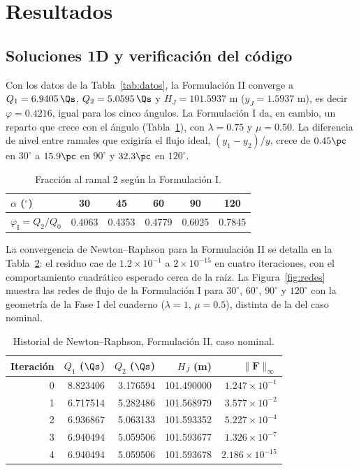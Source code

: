 \section{Resultados}\label{sec:resultados}
\subsection{Soluciones 1D y verificación del código}
Con los datos de la Tabla~\ref{tab:datos}, la Formulación II converge a $Q_1=6.9405\,\Qs$, $Q_2=5.0595\,\Qs$ y $H_J=101.5937$ m ($y_J=1.5937$ m), es decir $\varphi=0.4216$, igual para los cinco ángulos. La Formulación I da, en cambio, un reparto que crece con el ángulo (Tabla~\ref{tab:f1}), con $\lambda=0.75$ y $\mu=0.50$. La diferencia de nivel entre ramales que exigiría el flujo ideal, $(y_1-y_2)/y$, crece de $0.45\pc$ en $30^\circ$ a $15.9\pc$ en $90^\circ$ y $32.3\pc$ en $120^\circ$.

\begin{table}[H]
\centering\small
\caption{Fracción al ramal 2 según la Formulación I.}\label{tab:f1}
\begin{tabular}{lccccc}
\toprule
$\alpha$ ($^\circ$) & 30 & 45 & 60 & 90 & 120\\\midrule
$\varphi_{\mathrm I}=Q_2/Q_0$ & 0.4063 & 0.4353 & 0.4779 & 0.6025 & 0.7845\\\bottomrule
\end{tabular}
\end{table}

La convergencia de Newton--Raphson para la Formulación II se detalla en la Tabla~\ref{tab:iter}: el residuo cae de $1.2\times10^{-1}$ a $2\times10^{-15}$ en cuatro iteraciones, con el comportamiento cuadrático esperado cerca de la raíz. La Figura~\ref{fig:redes} muestra las redes de flujo de la Formulación I para $30^\circ$, $60^\circ$, $90^\circ$ y $120^\circ$ con la geometría de la Fase I del cuaderno ($\lambda=1$, $\mu=0.5$), distinta de la del caso nominal.

\begin{table}[H]
\centering\small
\caption{Historial de Newton--Raphson, Formulación II, caso nominal.}\label{tab:iter}
\begin{tabular}{rrrrr}
\toprule
Iteración & $Q_1$ ($\Qs$) & $Q_2$ ($\Qs$) & $H_J$ (m) & $\|\mathbf F\|_\infty$\\\midrule
0 & 8.823406 & 3.176594 & 101.490000 & $1.247\times10^{-1}$\\
1 & 6.717514 & 5.282486 & 101.568979 & $3.577\times10^{-2}$\\
2 & 6.936867 & 5.063133 & 101.593352 & $5.227\times10^{-4}$\\
3 & 6.940494 & 5.059506 & 101.593677 & $1.326\times10^{-7}$\\
4 & 6.940494 & 5.059506 & 101.593678 & $2.186\times10^{-15}$\\\bottomrule
\end{tabular}
\end{table}

